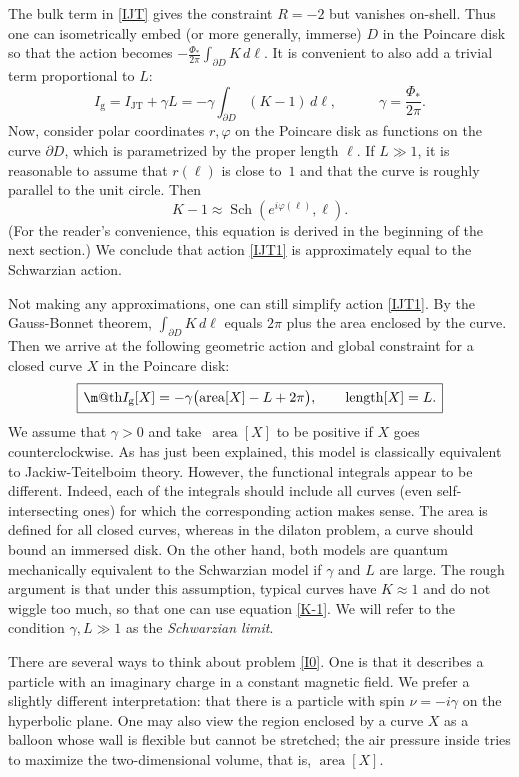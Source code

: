 \documentclass[11pt]{article}
\makeatletter
\newcommand*{\wideboxed}[1]{\setlength{\fboxsep}{1ex}%
  \fbox{\m@th$\displaystyle#1$}}
\newcommand{\vp}{\varphi}
\DeclareMathOperator{\Sch}{Sch}
\DeclareMathOperator{\area}{area}
\DeclareMathOperator{\len}{length}
\newcommand{\g}{\text{g}}
\makeatother
\begin{document}
The bulk term in \eqref{IJT} gives the constraint $R=-2$ but vanishes on-shell. Thus one can isometrically embed (or more generally, immerse) $D$ in the Poincare disk so that the action becomes $-\frac{\Phi_*}{2\pi}\int_{\partial D}K\,d\ell$. It is convenient to also add a trivial term proportional to $L$:
\begin{equation}\label{IJT1}
I_{\g}=I_{\text{JT}}+\gamma L=-\gamma\int_{\partial D}(K-1)\,d\ell,\qquad\quad
\gamma=\frac{\Phi_*}{2\pi}.
\end{equation}
Now, consider polar coordinates $r,\vp$ on the Poincare disk as functions on the curve $\partial D$, which is parametrized by the proper length $\ell$. If $L\gg 1$, it is reasonable to assume that $r(\ell)$ is close to~$1$ and that the curve is roughly parallel to the unit circle. Then
\begin{equation}\label{K-1}
K-1 \approx\Sch(e^{i\vp(\ell)},\ell).
\end{equation}
(For the reader's convenience, this equation is derived in the beginning of the next section.) We conclude that action \eqref{IJT1} is approximately equal to the Schwarzian action.

Not making any approximations, one can still simplify action \eqref{IJT1}. By the Gauss-Bonnet theorem, $\int_{\partial D}K\,d\ell$ equals $2\pi$ plus the area enclosed by the curve. Then we arrive at the following geometric action and global constraint for a closed curve $X$ in the Poincare disk:
\begin{equation}\label{I0}
\wideboxed{
I_{\g}[X]=-\gamma\bigl(\area[X]-L+2\pi\bigr),\qquad \len[X]=L.
}
\end{equation}
We assume that $\gamma>0$ and take $\,\area[X]$ to be positive if $X$ goes counterclockwise. As has just been explained, this model is classically equivalent to Jackiw-Teitelboim theory. However, the functional integrals appear to be different. Indeed, each of the integrals should include all curves (even self-intersecting ones) for which the corresponding action makes sense. The area is defined for all closed curves, whereas in the dilaton problem, a curve should bound an immersed disk. On the other hand, both models are quantum mechanically equivalent to the Schwarzian model if $\gamma$ and $L$ are large. The rough argument is that under this assumption, typical curves have $K\approx 1$ and do not wiggle too much, so that one can use equation \eqref{K-1}. We will refer to the condition $\gamma,L\gg 1$ as the \emph{Schwarzian limit}.

There are several ways to think about problem \eqref{I0}. One is that it describes a particle with an imaginary charge in a constant magnetic field. We prefer a slightly different interpretation: that there is a particle with spin $\nu=-i\gamma$ on the hyperbolic plane. One may also view the region enclosed by a curve $X$ as a balloon whose wall is flexible but cannot be stretched; the air pressure inside tries to maximize the two-dimensional volume, that is, $\area[X]$. 
\end{document}

